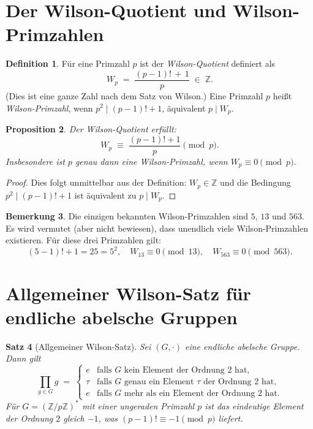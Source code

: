 \documentclass[12pt,a4paper]{amsart}
\newtheorem{theorem}{Satz}[section]
\newtheorem{proposition}[theorem]{Proposition}
\theoremstyle{definition}
\newtheorem{definition}[theorem]{Definition}
\newtheorem{bemerkung}[theorem]{Bemerkung}
\newcommand{\Z}{\mathbb{Z}}
\begin{document}
\section{Der Wilson-Quotient und Wilson-Primzahlen}

\begin{definition}\label{def:wilson_quotient}
  Für eine Primzahl $p$ ist der \emph{Wilson-Quotient} definiert als
  \[
    W_p \;=\; \frac{(p-1)!\,+\,1}{p} \;\in\; \Z.
  \]
  (Dies ist eine ganze Zahl nach dem Satz von Wilson.)
  Eine Primzahl $p$ heißt \emph{Wilson-Primzahl}, wenn $p^2 \mid (p-1)! + 1$,
  äquivalent $p \mid W_p$.
\end{definition}

\begin{proposition}\label{prop:wilson_quotient}
  Der Wilson-Quotient erfüllt:
  \[
    W_p \;\equiv\; \frac{(p-1)!+1}{p} \pmod{p}.
  \]
  Insbesondere ist $p$ genau dann eine Wilson-Primzahl, wenn $W_p \equiv 0 \pmod{p}$.
\end{proposition}

\begin{proof}
  Dies folgt unmittelbar aus der Definition: $W_p \in \Z$ und die Bedingung
  $p^2 \mid (p-1)!+1$ ist äquivalent zu $p \mid W_p$.
\end{proof}

\begin{bemerkung}
  Die einzigen bekannten Wilson-Primzahlen sind $5$, $13$ und $563$.
  Es wird vermutet (aber nicht bewiesen), dass unendlich viele Wilson-Primzahlen
  existieren.  Für diese drei Primzahlen gilt:
  \[
    (5-1)! + 1 = 25 = 5^2, \quad
    W_{13} \equiv 0 \pmod{13}, \quad
    W_{563} \equiv 0 \pmod{563}.
  \]
\end{bemerkung}

\section{Allgemeiner Wilson-Satz für endliche abelsche Gruppen}\label{sec:allgemein_wilson}

\begin{theorem}[Allgemeiner Wilson-Satz]\label{satz:allgemein_wilson}
  Sei $(G, \cdot)$ eine endliche abelsche Gruppe.  Dann gilt
  \[
    \prod_{g \in G} g
    \;=\;
    \begin{cases}
      e        & \text{falls } G \text{ kein Element der Ordnung } 2 \text{ hat}, \\
      \tau      & \text{falls } G \text{ genau ein Element } \tau \text{ der Ordnung } 2 \text{ hat}, \\
      e        & \text{falls } G \text{ mehr als ein Element der Ordnung } 2 \text{ hat}.
    \end{cases}
  \]
  Für $G = (\Z/p\Z)^*$ mit einer ungeraden Primzahl $p$ ist das eindeutige
  Element der Ordnung $2$ gleich $-1$, was $(p-1)! \equiv -1 \pmod{p}$ liefert.
\end{theorem}
\end{document}
